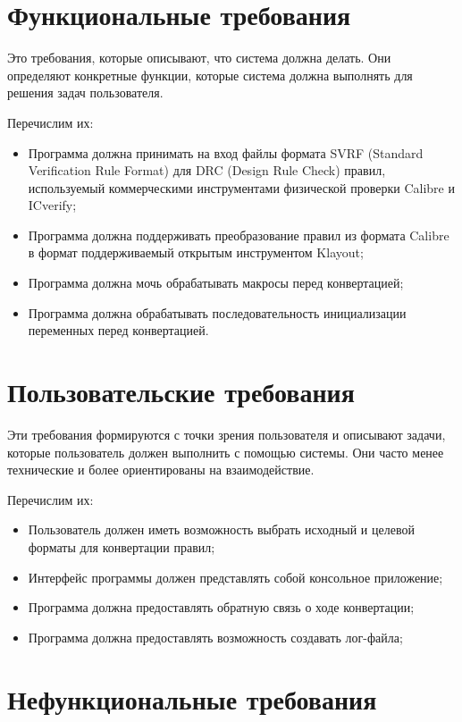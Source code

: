 \section{Функциональные требования}

Это требования, которые описывают, что система должна делать.
Они определяют конкретные функции,
которые система должна выполнять для решения задач пользователя.

Перечислим их:

\begin{itemize}
    \item Программа должна принимать на вход файлы
		формата SVRF (Standard Verification Rule Format)
		для DRC (Design Rule Check) правил,
		используемый коммерческими инструментами физической проверки
		Calibre и ICverify;
    \item Программа должна поддерживать преобразование правил из формата
		Calibre в формат поддерживаемый открытым инструментом Klayout;
    \item Программа должна мочь обрабатывать макросы перед конвертацией;
    \item Программа должна обрабатывать последовательность 
		инициализации переменных перед конвертацией.
\end{itemize}

\section{Пользовательские требования}

Эти требования формируются с точки зрения пользователя и описывают задачи,
которые пользователь должен выполнить с помощью системы.
Они часто менее технические и более ориентированы на взаимодействие.

Перечислим их:

\begin{itemize}
    \item Пользователь должен иметь возможность выбрать исходный
		и целевой форматы для конвертации правил;
    \item Интерфейс программы должен представлять собой консольное приложение;
    \item Программа должна предоставлять обратную связь о ходе конвертации;
    \item Программа должна предоставлять возможность создавать лог-файла;
\end{itemize}

\section{Нефункциональные требования}

